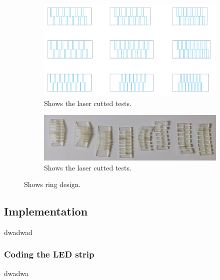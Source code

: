 \documentclass[12pt,twoside,a4paper]{article}
\begin{document}
        \begin{figure}[ht!]
            \centering
            \begin{subfigure}{.5\textwidth}
              \centering
              \includegraphics[width=.8\linewidth]{images/process/test_shapes.PNG}
              \caption{Shows the laser cutted tests.}
              \label{fig:test_shapes}
            \end{subfigure}%
            \begin{subfigure}{.5\textwidth}
              \centering
              \includegraphics[width=.8\linewidth]{images/process/laserCutTests.jpg}
              \caption{Shows the laser cutted tests.}
              \label{fig:ringdesign2}
            \end{subfigure}
            \caption{Shows ring design.}
            \label{fig:laserCutTests}
        \end{figure}

    \subsection{Implementation}
        \begin{flushleft}
        dwadwad
        \end{flushleft}

    \subsubsection{Coding the LED strip}
        \begin{flushleft}
        dwadwa
        \end{flushleft}
\end{document}
